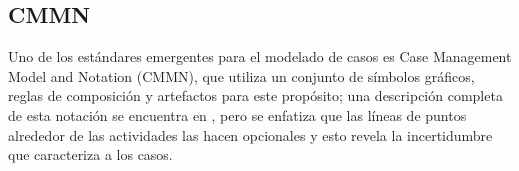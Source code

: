 






\subsection{CMMN}
\label{Sec:CMMN}

Uno de los estándares emergentes para el modelado de casos es Case Management Model and Notation (CMMN), que utiliza un conjunto de símbolos gráficos, reglas de composición y artefactos para este propósito; una descripción completa de esta notación se encuentra en \cite {Cmmn}, pero se enfatiza que las líneas de puntos alrededor de las actividades las hacen opcionales y esto revela la incertidumbre que caracteriza a los casos.

